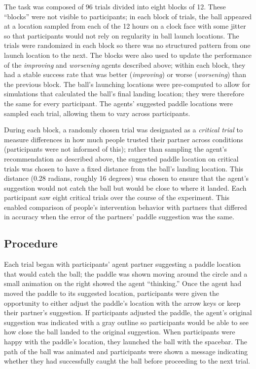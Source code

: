 \documentclass[10pt,letterpaper]{article}
\begin{document}
The task was composed of 96 trials divided into eight blocks of 12. These ``blocks'' were not visible to participants; in each block of trials, the ball appeared at a location sampled from each of the 12 hours on a clock face with some jitter so that participants would not rely on regularity in ball launch locations. The trials were randomized in each block so there was no structured pattern from one launch location to the next. The blocks were also used to update the performance of the \textit{improving} and \textit{worsening} agents described above; within each block, they had a stable success rate that was better (\textit{improving}) or worse (\textit{worsening}) than the previous block. The ball's launching locations were pre-computed to allow for simulations that calculated the ball's final landing location; they were therefore the same for every participant. The agents' suggested paddle locations were sampled each trial, allowing them to vary across participants. 

During each block, a randomly chosen trial was designated as a \textit{critical trial} to measure differences in how much people trusted their partner across conditions (participants were not informed of this); rather than sampling the agent's recommendation as described above, the suggested paddle location on critical trials was chosen to have a fixed distance from the ball's landing location. This distance (0.28 radians, roughly 16 degrees) was chosen to ensure that the agent's suggestion would not catch the ball but would be close to where it landed. Each participant saw eight critical trials over the course of the experiment. This enabled comparison of people's intervention behavior with partners that differed in accuracy when the error of the partners' paddle suggestion was the same. 


\subsection{Procedure}

Each trial began with participants' agent partner suggesting a paddle location that would catch the ball; the paddle was shown moving around the circle and a small animation on the right showed the agent ``thinking.'' Once the agent had moved the paddle to its suggested location, participants were given the opportunity to either adjust the paddle's location with the arrow keys or keep their partner's suggestion. If participants adjusted the paddle, the agent's original suggestion was indicated with a gray outline so participants would be able to see how close the ball landed to the original suggestion. When participants were happy with the paddle's location, they launched the ball with the spacebar. The path of the ball was animated and participants were shown a message indicating whether they had successfully caught the ball before proceeding to the next trial. 
\end{document}
